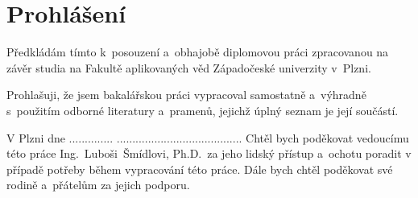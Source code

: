 \section*{Prohlášení}
Předkládám tímto k~posouzení a~obhajobě diplomovou práci zpracovanou na závěr studia na Fakultě aplikovaných věd Západočeské univerzity v~Plzni.

Prohlašuji, že jsem bakalářskou práci vypracoval samostatně a~výhradně s~použitím odborné literatury a~pramenů, jejichž úplný seznam je její součástí.

\vspace*{1.5cm}
V Plzni dne .............. \hfill ........................................
\thispagestyle{empty}
\newpage
Chtěl bych poděkovat vedoucímu této práce Ing.~Luboši~Šmídlovi, Ph.D.~za jeho lidský přístup a~ochotu poradit v případě potřeby během vypracování této práce.
Dále bych chtěl poděkovat své rodině a~přátelům za jejich podporu.
\thispagestyle{empty}
